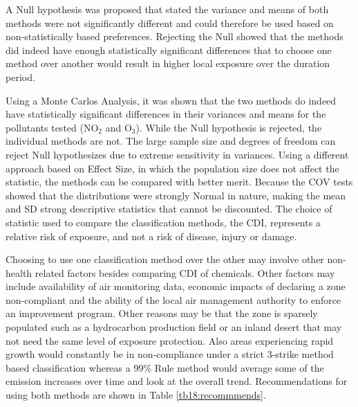 A Null hypothesis was proposed that stated the variance and means of both methods were not significantly different and could therefore be used based on non-statistically based preferences. Rejecting the Null showed that the methods did indeed have enough statistically significant differences that to choose one method over another would result in higher local exposure over the duration period. 

Using a Monte Carlos Analysis, it was shown that the two methods do indeed have statistically significant differences in their variances and means for the pollutants tested (NO$_{2}$ and O$_{3}$). While the Null hypothesis is rejected, the individual methods are not. The large sample size and degrees of freedom can reject Null hypothesizes due to extreme sensitivity in variances. Using a different approach based on Effect Size, in which the population size does not affect the statistic, the methods can be compared with better merit. Because the COV tests showed that the distributions were strongly Normal in nature, making the mean and SD strong descriptive statistics that cannot be discounted. The choice of statistic used to compare the classification methods, the CDI, represents a relative risk of exposure, and not a risk of disease, injury or damage. 

Choosing to use one classification method over the other may involve other non-health related factors besides comparing CDI of chemicals. Other factors may include availability of air monitoring data, economic impacts of declaring a zone non-compliant and the ability of the local air management authority to enforce an improvement program. Other reasons may be that the zone is sparsely populated such as a hydrocarbon production field or an inland desert that may not need the same level of exposure protection. Also areas experiencing rapid growth would constantly be in non-compliance under a strict 3-strike method based classification whereas a 99\% Rule method would average some of the emission increases over time and look at the overall trend. Recommendations for using both methods are shown in Table \ref{tb18:recommmends}.

% 
\begin{table}[H]
\centering
\caption{Recommended uses for classification methods.}
\label{tb18:recommmends}
\end{table}

